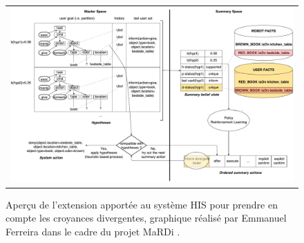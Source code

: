 \documentclass[a4paper,11pt,twoside]{StyleThese}
\begin{document}
\clearpage

\begin{figure}
 \centering
 \begin{tabular}{c}
  \includegraphics[width=1.0\textwidth]{img/MaRDHIS.pdf}
 \end{tabular}
 \caption{Aperçu de l'extension apportée au système HIS pour prendre en compte les croyances divergentes, graphique réalisé par Emmanuel Ferreira dans le cadre du projet MaRDi \cite{ferreira2015phd}.}
 \label{fig:overview-mardhis}
\end{figure}


\clearpage
\end{document}

